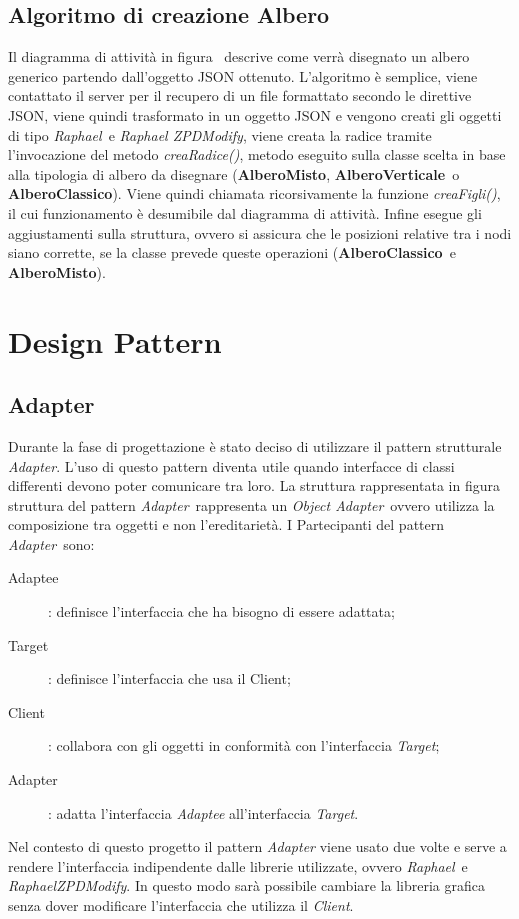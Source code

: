 \subsection{Algoritmo di creazione Albero}
Il diagramma di attività in figura \ descrive come verrà disegnato un albero generico partendo dall'oggetto JSON ottenuto.
L'algoritmo è semplice, viene contattato il server per il recupero di un file formattato secondo le direttive JSON, viene quindi trasformato in un oggetto JSON e vengono creati gli oggetti di tipo \textit{Raphael}\ e \textit{Raphael ZPDModify}, viene creata la radice tramite l'invocazione del metodo \textit{creaRadice()}, metodo eseguito sulla classe scelta in base alla tipologia di albero da disegnare (\textbf{AlberoMisto}, \textbf{AlberoVerticale}\ o \textbf{AlberoClassico}). Viene quindi chiamata ricorsivamente la funzione \textit{creaFigli()}, il cui funzionamento è desumibile dal diagramma di attività. Infine esegue gli aggiustamenti sulla struttura, ovvero si assicura che le posizioni relative tra i nodi siano corrette, se la classe prevede queste operazioni (\textbf{AlberoClassico}\ e \textbf{AlberoMisto}).
\newpage
\section{Design Pattern}
\subsection{Adapter}
Durante la fase di progettazione è stato deciso di utilizzare il pattern strutturale \textit{Adapter}.
L'uso di questo pattern diventa utile quando interfacce di classi differenti devono poter comunicare
tra loro.
La struttura rappresentata in figura struttura del pattern \textit{Adapter}\ rappresenta un \textit{Object Adapter}\ ovvero utilizza la composizione tra oggetti e non l'ereditarietà.
I Partecipanti del pattern \textit{Adapter}\ sono:
\begin{description}
\item [Adaptee]: definisce l'interfaccia che ha bisogno di essere adattata;
\item [Target]: definisce l'interfaccia che usa il Client;
\item [Client]: collabora con gli oggetti in conformità con l'interfaccia \textit{Target};
\item [Adapter]: adatta l’interfaccia \textit{Adaptee} all'interfaccia \textit{Target}.
\end{description}
Nel contesto di questo progetto il pattern \textit{Adapter} viene usato due volte e serve a
rendere l'interfaccia indipendente dalle librerie utilizzate, ovvero \textit{Raphael}\ e \textit{RaphaelZPDModify}. In questo modo sarà possibile cambiare la libreria grafica senza dover modificare l'interfaccia che utilizza il \textit{Client}. 
